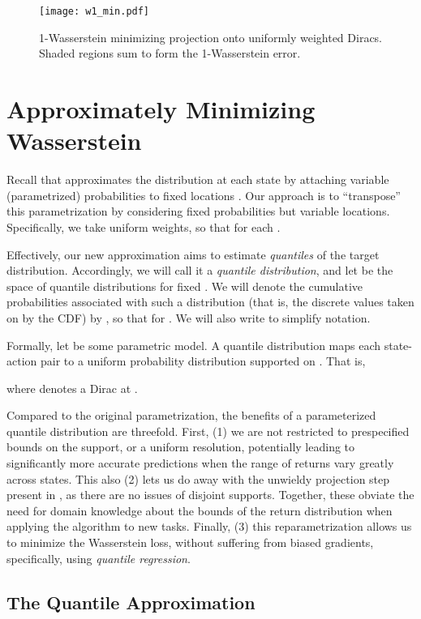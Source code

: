 \documentclass[letterpaper]{article}
\begin{document}
\begin{figure}[t]
\begin{center}
\texttt{[image: w1\_min.pdf]}
\end{center}
\caption{1-Wasserstein minimizing projection onto  uniformly weighted Diracs. Shaded regions sum to form the 1-Wasserstein error.\label{fig:wmin}}
\end{figure}


\section{Approximately Minimizing Wasserstein}
Recall that  approximates the distribution at each state by attaching variable (parametrized) probabilities  to fixed locations . Our approach is to ``transpose'' this parametrization by considering fixed probabilities but variable locations. 
Specifically, we take uniform weights, so that  for each .

Effectively, our new approximation aims to estimate \emph{quantiles} of the target distribution. Accordingly, we will call it a \emph{quantile distribution}, and let  be the space of quantile distributions for fixed . We will denote the cumulative probabilities associated with such a distribution (that is, the discrete values taken on by the CDF) by , so that  for . We will also write  to simplify notation.

Formally, let  be some parametric model. A quantile distribution  maps each state-action pair  to a uniform probability distribution supported on . That is, 

where  denotes a Dirac at .

Compared to the original parametrization, the benefits of a parameterized quantile distribution are threefold. First, (1) we are not restricted to prespecified bounds on the support, or a uniform resolution, potentially leading to significantly more accurate predictions when the range of returns vary greatly across states. This also (2) lets us do away with the unwieldy projection step present in , as there are no issues of disjoint supports. Together, these obviate the need for domain knowledge about the bounds of the return distribution when applying the algorithm to new tasks. Finally, (3) this reparametrization allows us to minimize the Wasserstein loss, without suffering from biased gradients, specifically, using \emph{quantile regression}.


\subsection{The Quantile Approximation}
\end{document}

